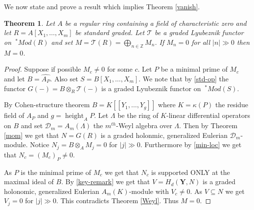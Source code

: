 \documentclass{amsart}
\newcommand{\ZZ}{\mathbb{Z} }
\newcommand{\D}{\mathcal{D} }
\newcommand{\bY}{\mathbf{Y} }
\newcommand{\FF}{\mathcal{T}}
\newcommand{\height}{\operatorname{height}}
\theoremstyle{plain}
\newtheorem{theorem}{Theorem}[section]
\theoremstyle{definition}
\theoremstyle{remark}
\begin{document}
We now state and prove a result which implies Theorem \ref{vanish}.
\begin{theorem}\label{vanish-general}
Let $A$ be a regular ring containing a field of characteristic zero and let $R = A[X_1,\ldots, X_m]$ be standard graded.
Let $\FF$ be a graded Lyubeznik functor on $\ ^* Mod(R)$ and set $M = \FF(R) = \bigoplus_{n \in \ZZ}M_n$. If
$M_n = 0$ for all $|n| \gg 0$ then $M = 0$.
\end{theorem}
\begin{proof}
 Suppose if possible $M_c \neq 0$ for some $c$. Let $P$ be a minimal prime of $M_c$ and let $B = \widehat{A_P}$. Also 
 set $S = B[X_1,\ldots, X_m]$.
 We note that by \ref{std-op} the functor $G(-) = B \otimes_R \FF(-)$ is a graded Lyubeznik functor on $ \ ^* Mod(S)$.
 
 By Cohen-structure theorem $B = K[[Y_1,\ldots, Y_g]]$ where $K = \kappa(P)$ the residue field of $A_P$  and $g = \height_A P$.
 Let $\Lambda $ be the ring of $K$-linear differential operators on $B$ and set $\D_m = A_m(\Lambda)$ the $m^{th}$-Weyl algebra
 over $\Lambda$. Then by Theorem \ref{mom}  we get that $N = G(R)$ is a graded holonmic, generalized Eulerian
 $\D_m$-module. Notice $N_j = B\otimes_A M_j = 0$ for $|j| \gg 0$. Furthermore by \ref{min-loc} we get that 
 $N_c = (M_c)_P \neq 0$. 
 
 As $P$ is the minimal prime of $M_c$ we get that $N_c$ is supported  ONLY at the maximal ideal of $B$.
 By \ref{key-remark} we get that
 $V = H_d(\bY, N)$ is a graded holonomic, generalized Eulerian $A_m(K)$-module with $V_c \neq 0$. 
As $V \subseteq N$ we get 
  $V_j = 0$ for $|j| \gg 0$.  
 This contradicts  Theorem \ref{Weyl}. Thus $M = 0$.
\end{proof}


 
\end{document}
